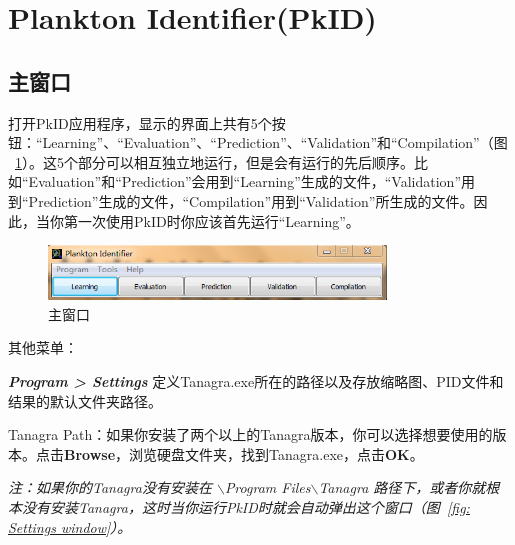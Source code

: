 \documentclass[12pt]{article}
\begin{document}
%
%
%
%

\section{Plankton Identifier(PkID)}

\subsection{主窗口}

打开PkID应用程序，显示的界面上共有5个按钮：“Learning”、“Evaluation”、“Prediction”、“Validation”和“Compilation”（图~\ref{fig: Main window}）。这5个部分可以相互独立地运行，但是会有运行的先后顺序。比如“Evaluation”和“Prediction”会用到“Learning”生成的文件，“Validation”用到“Prediction”生成的文件，“Compilation”用到“Validation”所生成的文件。因此，当你第一次使用PkID时你应该首先运行“Learning”。

\begin{figure}[!ht]
\centering
\includegraphics[width=0.8\textwidth]{mainWindow.png}
\caption{主窗口}
\label{fig: Main window}
\end{figure} 

其他菜单：

\textit{\textbf{Program > Settings}} 定义Tanagra.exe所在的路径以及存放缩略图、PID文件和结果的默认文件夹路径。

Tanagra Path：如果你安装了两个以上的Tanagra版本，你可以选择想要使用的版本。点击\textbf{Browse}，浏览硬盘文件夹，找到Tanagra.exe，点击\textbf{OK}。

\textit{注：如果你的Tanagra没有安装在 $\backslash$Program Files$\backslash$Tanagra 路径下，或者你就根本没有安装Tanagra，这时当你运行PkID时就会自动弹出这个窗口（图~\ref{fig: Settings window}）。}
\end{document}
